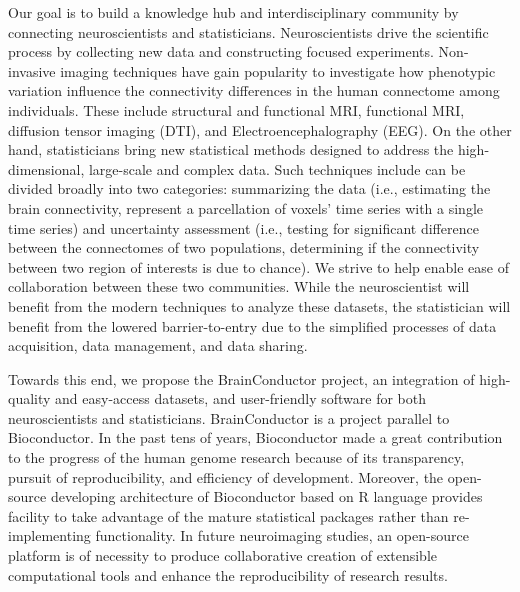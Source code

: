 \documentclass{nature}
\begin{document}
Our goal is to %
build a knowledge hub and interdisciplinary community by connecting
neuroscientists and statisticians.  Neuroscientists 
drive the scientific process by collecting new data and constructing focused
experiments. Non-invasive imaging techniques have gain popularity to 
investigate how phenotypic variation
influence the connectivity differences in the human
connectome among individuals\cite{sporns2005human,sporns2011human}. These
include structural and functional MRI,
functional MRI, diffusion tensor imaging (DTI), and Electroencephalography
(EEG).
On
the other hand, statisticians bring new statistical methods
designed to address the high-dimensional, large-scale and complex
data. Such techniques include can be divided broadly into
two categories:
summarizing the data (i.e., estimating the brain connectivity, represent
a parcellation of voxels' time series with a single time series) 
and uncertainty assessment (i.e., testing for significant difference
between the connectomes of two populations, determining if the 
connectivity between two region of interests is due to chance).
We strive to help enable ease of collaboration between these two communities. 
While the neuroscientist will benefit from the modern techniques to
analyze these datasets, the statistician 
will benefit from the lowered barrier-to-entry
due to the  simplified processes of data acquisition, data management, and data
sharing. 


Towards this end, we propose the BrainConductor project, an integration of
high-quality and easy-access datasets, and user-friendly software for both
neuroscientists and statisticians. BrainConductor is a project parallel to
Bioconductor. In the past tens of years,
Bioconductor\cite{gentleman2004bioconductor} made a great contribution to the
progress of
the human genome research because of its transparency, pursuit of
reproducibility, and efficiency of development. Moreover, the open-source
developing architecture of Bioconductor based on R language provides facility to
take advantage of the mature statistical packages rather than re-implementing
functionality. In future neuroimaging studies, an open-source platform is of
necessity to produce collaborative creation of extensible computational tools
and enhance the reproducibility of research results.
\end{document}
